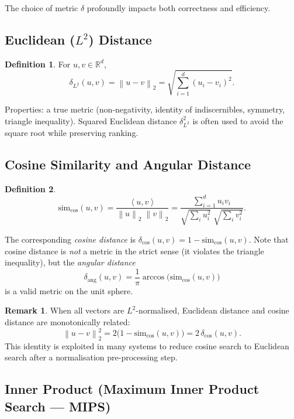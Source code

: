 \documentclass[11pt,a4paper]{article}
\theoremstyle{definition}
\newtheorem{definition}{Definition}[section]
\newtheorem{remark}{Remark}[section]
\newcommand{\R}{\mathbb{R}}
\newcommand{\norm}[1]{\left\lVert #1 \right\rVert}
\newcommand{\inner}[2]{\left\langle #1, #2 \right\rangle}
\begin{document}
The choice of metric $\delta$ profoundly impacts both correctness and
efficiency.

\subsection{Euclidean ($L^2$) Distance}

\begin{definition}
For $u, v \in \R^d$,
\[
  \delta_{L^2}(u,v) = \norm{u - v}_2 = \sqrt{\sum_{i=1}^{d}(u_i - v_i)^2}.
\]
\end{definition}

Properties: a true metric (non-negativity, identity of indiscernibles,
symmetry, triangle inequality).  Squared Euclidean distance
$\delta_{L^2}^2$ is often used to avoid the square root while preserving
ranking.

\subsection{Cosine Similarity and Angular Distance}

\begin{definition}
\[
  \mathrm{sim}_{\cos}(u,v) = \frac{\inner{u}{v}}{\norm{u}_2\;\norm{v}_2}
  = \frac{\sum_{i=1}^d u_i v_i}{\sqrt{\sum_i u_i^2}\;\sqrt{\sum_i v_i^2}}.
\]
\end{definition}

The corresponding \emph{cosine distance} is $\delta_{\cos}(u,v) = 1 -
\mathrm{sim}_{\cos}(u,v)$.  Note that cosine distance is \emph{not} a
metric in the strict sense (it violates the triangle inequality), but the
\emph{angular distance}
\[
  \delta_{\mathrm{ang}}(u,v) = \frac{1}{\pi}\arccos\!\bigl(\mathrm{sim}_{\cos}(u,v)\bigr)
\]
is a valid metric on the unit sphere.

\begin{remark}
When all vectors are $L^2$-normalised, Euclidean distance and cosine
distance are monotonically related:
\[
  \norm{u-v}_2^2 = 2\bigl(1 - \mathrm{sim}_{\cos}(u,v)\bigr)
  = 2\,\delta_{\cos}(u,v).
\]
This identity is exploited in many systems to reduce cosine search to
Euclidean search after a normalisation pre-processing step.
\end{remark}

\subsection{Inner Product (Maximum Inner Product Search --- MIPS)}
\end{document}
